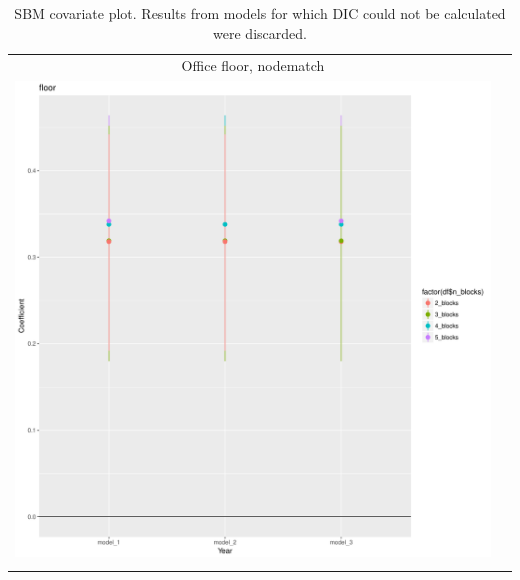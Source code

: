 \documentclass[fleqn,12pt]{wlscirep}
\begin{document}
\clearpage
\begin{longtable}[!h]{c@{\hskip 0cm}c}
Office floor, nodematch \\
\includegraphics[height=.75\textheight, clip=true, trim=.5cm .5cm 0cm .6cm]{figures/rl_plots1/floor.pdf}   \\
\caption{\label{fig:SBM_plot_sci} SBM covariate plot. Results from models for which DIC could not be calculated were discarded.}
\end{longtable}
\end{document}
